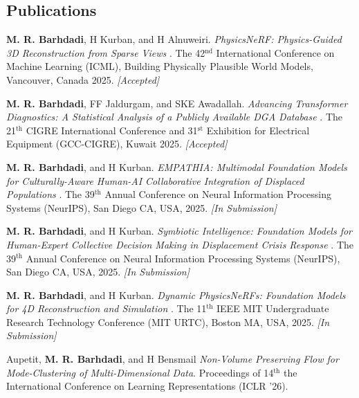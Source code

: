 \documentclass[resmargin, 10pt]{res} %
\begin{document}
\begin{resume}
\vspace{-6pt}
\section{Publications} 

{\bf M. R. Barhdadi}, H Kurban, and H Alnuweiri. {\sl PhysicsNeRF: Physics-Guided 3D Reconstruction from Sparse Views} . The 42$^{\text{nd}}$ International Conference on Machine Learning (ICML), Building Physically Plausible World Models, Vancouver, Canada 2025. {\sl[Accepted]}

\vspace{-4pt}
{\bf M. R. Barhdadi}, FF Jaldurgam, and SKE Awadallah. {\sl Advancing Transformer Diagnostics: A Statistical Analysis of a Publicly Available DGA Database} . The 21$^{\text{th}}$ CIGRE International Conference and 31$^{\text{st}}$ Exhibition for Electrical Equipment (GCC-CIGRE), Kuwait 2025. {\sl[Accepted]}

\vspace{-4pt}
{\bf M. R. Barhdadi}, and H Kurban. {\sl EMPATHIA: Multimodal Foundation Models for Culturally-Aware Human-AI Collaborative Integration of Displaced Populations} . The 39$^{\text{th}}$ Annual Conference on Neural Information Processing Systems (NeurIPS), San Diego CA, USA, 2025. {\sl[In Submission]}

\vspace{-4pt}
{\bf M. R. Barhdadi}, and H Kurban. {\sl Symbiotic Intelligence: Foundation Models for Human-Expert Collective Decision Making in Displacement Crisis Response} . The 39$^{\text{th}}$ Annual Conference on Neural Information Processing Systems (NeurIPS), San Diego CA, USA, 2025. {\sl[In Submission]} 

\vspace{-4pt}
{\bf M. R. Barhdadi}, and H Kurban. {\sl Dynamic PhysicsNeRFs: Foundation Models for 4D Reconstruction and Simulation} . The 11$^{\text{th}}$ IEEE MIT Undergraduate Research Technology Conference (MIT URTC), Boston MA, USA, 2025. {\sl[In Submission]}

\vspace{-4pt}
\M Aupetit, {\bf M. R. Barhdadi}, and H Bensmail {\sl Non-Volume Preserving Flow for Mode-Clustering of Multi-Dimensional Data}. Proceedings of 14$^{\text{th}}$ the International Conference on Learning Representations (ICLR ’26).


\vspace{-3pt}
\vspace{-3pt}

\end{resume}
\end{document}
